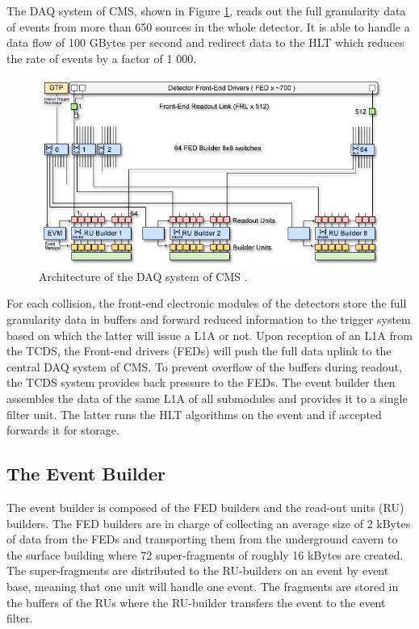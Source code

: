     The DAQ system of CMS, shown in Figure \ref{fig:I-3-daq}, reads out the full granularity data of events from more than 650 sources in the whole detector. It is able to handle a data flow of 100 GBytes per second and redirect data to the HLT which reduces the rate of events by a factor of 1 000. \\

      \begin{figure}[h!]
        \centering
        \includegraphics[width=\textwidth]{img/I-3-cms/daq.jpg}
        \caption{Architecture of the DAQ system of CMS \cite{1748-0221-3-08-S08004}.}
        \label{fig:I-3-daq}
      \end{figure}

    For each collision, the front-end electronic modules of the detectors store the full granularity data in buffers and forward reduced information to the trigger system based on which the latter will issue a L1A or not. Upon reception of an L1A from the TCDS, the Front-end drivers (FEDs) will push the full data uplink to the central DAQ system of CMS. To prevent overflow of the buffers during readout, the TCDS system provides back pressure to the FEDs. The event builder then assembles the data of the same L1A of all submodules and provides it to a single filter unit. The latter runs the HLT algorithms on the event and if accepted forwards it for storage.

    \subsection{The Event Builder}

      The event builder is composed of the FED builders and the read-out units (RU) builders. The FED builders are in charge of collecting an average size of 2 kBytes of data from the FEDs and transporting them from the underground cavern to the surface building where 72 super-fragments of roughly 16 kBytes are created. The super-fragments are distributed to the RU-builders on an event by event base, meaning that one unit will handle one event. The fragments are stored in the buffers of the RUs where the RU-builder transfers the event to the event filter.

